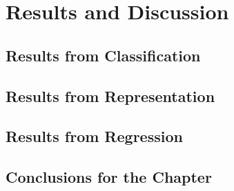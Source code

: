 \chapter{Results and Discussion}

\section{Results from Classification}




\section{Results from Representation}




\section{Results from Regression}





\section{Conclusions for the Chapter}